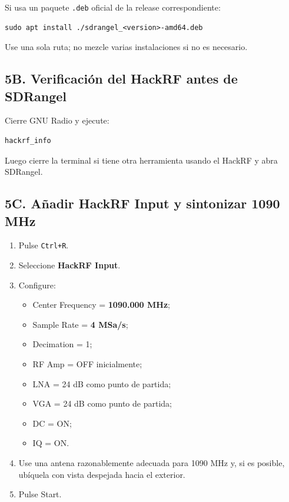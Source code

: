Si usa un paquete \texttt{.deb} oficial de la release correspondiente:

\begin{lstlisting}
sudo apt install ./sdrangel_<version>-amd64.deb
\end{lstlisting}

Use una sola ruta; no mezcle varias instalaciones si no es necesario.

\subsection{5B. Verificación del HackRF antes de SDRangel}

Cierre GNU Radio y ejecute:

\begin{lstlisting}
hackrf_info
\end{lstlisting}

Luego cierre la terminal si tiene otra herramienta usando el HackRF y abra SDRangel.

\subsection{5C. Añadir HackRF Input y sintonizar 1090 MHz}

\begin{enumerate}
    \item Pulse \texttt{Ctrl+R}.
    \item Seleccione \textbf{HackRF Input}.
    \item Configure:
    \begin{itemize}
        \item Center Frequency = \textbf{1090.000 MHz};
        \item Sample Rate = \textbf{4 MSa/s};
        \item Decimation = 1;
        \item RF Amp = OFF inicialmente;
        \item LNA = 24 dB como punto de partida;
        \item VGA = 24 dB como punto de partida;
        \item DC = ON;
        \item IQ = ON.
    \end{itemize}
    \item Use una antena razonablemente adecuada para 1090 MHz y, si es posible, ubíquela con vista despejada hacia el exterior.
    \item Pulse Start.
\end{enumerate}


